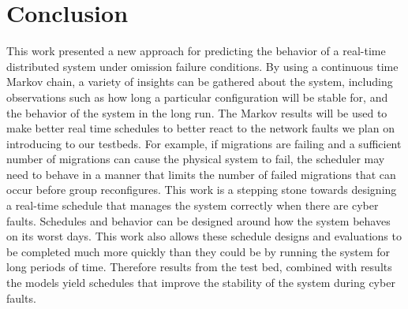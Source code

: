 \section{Conclusion}

This work presented a new approach for predicting the behavior of a real-time
distributed system under omission failure conditions. By using a continuous time
Markov chain, a variety of insights can be gathered about the system, including
observations such as how long a particular configuration will be stable for, 
and the behavior of the system in the long run.  The Markov results will be used
 to make better real time schedules to better react to the network faults we
plan on introducing to our testbeds. For example, if migrations are failing
and a sufficient number of migrations can cause the physical system to fail,
the scheduler may need to behave in a manner that limits the number of failed
migrations that can occur before group reconfigures. This work is a stepping
stone towards designing a real-time schedule that manages the system correctly
when there are cyber faults. Schedules and behavior can be designed around how
the system behaves on its worst days. This work also allows these schedule designs
and evaluations to be completed much more quickly than they could be by running
the system for long periods of time. Therefore results from the test bed, combined
with results the models yield schedules that improve the stability of the
system during cyber faults.




